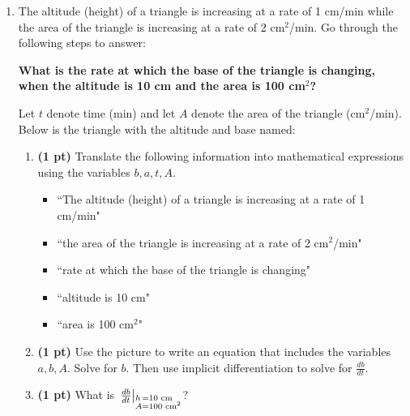 \documentclass[12pt]{article}
\begin{document}
\begin{enumerate}
\newpage
\item %
 The altitude (height) of a triangle is increasing at a rate of 1 cm/min while the area of the triangle is increasing at a rate of 2 cm$^{\text{2}}$/min.  Go through the following steps to answer:
\vspace{-0.5pc}
\begin{center}
\textbf{
What is the rate at which the base of the triangle is changing, when the altitude is 10 cm and the area is 100 cm$^{\text{2}}$?
}
\end{center}
Let $t$ denote time (min) and let $A$ denote the area of the triangle (cm$^{\text{2}}$/min).  Below is the triangle with the altitude and base named:
\vspace{-1pc}
\begin{center}
\end{center}
\vspace{-1.5pc}
\begin{enumerate}
	\item {\bf (1 pt)} Translate the following information into mathematical expressions using the variables $b,a,t,A$.
		\begin{itemize}
		\item ``The altitude (height) of a triangle is increasing at a rate of 1 cm/min"
		\item ``the area of the triangle is increasing at a rate of 2 cm$^{\text{2}}$/min"
		\item ``rate at which the base of the triangle is changing"
		\item ``altitude is 10 cm"
		\item ``area is 100 cm$^{\text{2}}$"
		\end{itemize}
	\item {\bf (1 pt)} Use the picture to write an equation that includes the variables $a,b,A$.  Solve for $b$.  Then use implicit differentiation to solve for $\frac{db}{dt}$.
	\item {\bf (1 pt)} What is $\left.\frac{db}{dt}\right|_{\substack{h\,=10\text{ cm}\hfill \\ A=100\text{ cm}^2}\hfill}$?
\end{enumerate}


\end{enumerate}
\end{document}

